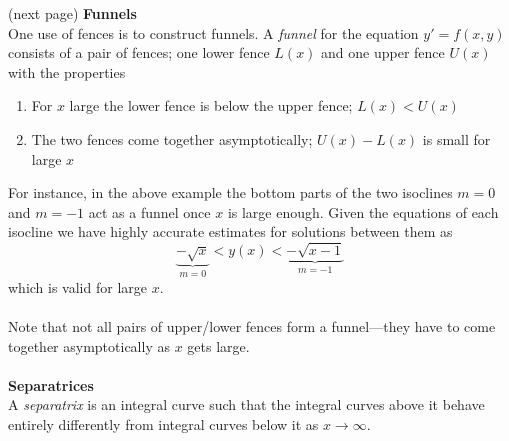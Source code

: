 \documentclass{report}
\begin{document}
(next page)
\newpage
\noindent\textbf{Funnels}\\
One use of fences is to construct funnels. A \textit{funnel} for the equation $y'=f(x,y)$ consists of a pair of 
fences; one lower fence $L(x)$ and one upper fence $U(x)$ with the properties
\begin{enumerate}
\item For $x$ large the lower fence is below the upper fence; $L(x)<U(x)$
\item The two fences come together asymptotically; $U(x)-L(x)$ is small for large $x$
\end{enumerate}
For instance, in the above example the bottom parts of the two isoclines $m=0$ and $m=-1$ act as a funnel
once $x$ is large enough. Given the equations of each isocline we have highly accurate estimates for solutions
between them as
\begin{equation*}
\underbrace{-\sqrt{x}}_{m=0}<y(x)<\underbrace{-\sqrt{x-1}}_{m=-1}
\end{equation*}
which is valid for large $x$.\\
\vspace{1mm}\\
Note that not all pairs of upper/lower fences form a funnel---they have to come together asymptotically as $x$ 
gets large.\\
\vspace{1mm}\\
\textbf{Separatrices}\\
A \textit{separatrix} is an integral curve such that the integral curves above it behave entirely differently from
integral curves below it as $x\to\infty$.
\newpage
\end{document}
